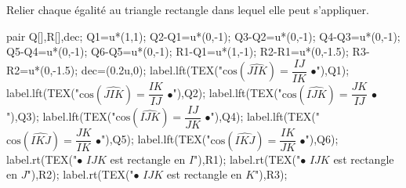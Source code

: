 \begin{exercice*}
    Relier chaque égalité au triangle rectangle dans \mbox{lequel} elle peut s'appliquer.
    \begin{center}
        \begin{Geometrie}[CoinBG={(-2u,-5u)}]
            pair Q[],R[],dec;
            Q1=u*(1,1);
            Q2-Q1=u*(0,-1);
            Q3-Q2=u*(0,-1);
            Q4-Q3=u*(0,-1);
            Q5-Q4=u*(0,-1);
            Q6-Q5=u*(0,-1);
            R1-Q1=u*(1,-1);
            R2-R1=u*(0,-1.5);
            R3-R2=u*(0,-1.5);
            dec=(0.2u,0);
            label.lft(TEX("$\text{cos}(\widehat{JIK})=\dfrac{IJ}{IK}$ $\bullet$"),Q1);
            label.lft(TEX("$\text{cos}(\widehat{JIK})=\dfrac{IK}{IJ}$ $\bullet$"),Q2);
            label.lft(TEX("$\text{cos}(\widehat{IJK})=\dfrac{JK}{IJ}$ $\bullet$"),Q3);
            label.lft(TEX("$\text{cos}(\widehat{IJK})=\dfrac{IJ}{JK}$ $\bullet$"),Q4);
            label.lft(TEX("$\text{cos}(\widehat{IKJ})=\dfrac{JK}{IK}$ $\bullet$"),Q5);
            label.lft(TEX("$\text{cos}(\widehat{IKJ})=\dfrac{IK}{JK}$ $\bullet$"),Q6);
            label.rt(TEX("$\bullet$ $IJK$ est rectangle en $I$"),R1);
            label.rt(TEX("$\bullet$ $IJK$ est rectangle en $J$"),R2);
            label.rt(TEX("$\bullet$ $IJK$ est rectangle en $K$"),R3);
        \end{Geometrie}
    \end{center}
\end{exercice*}
